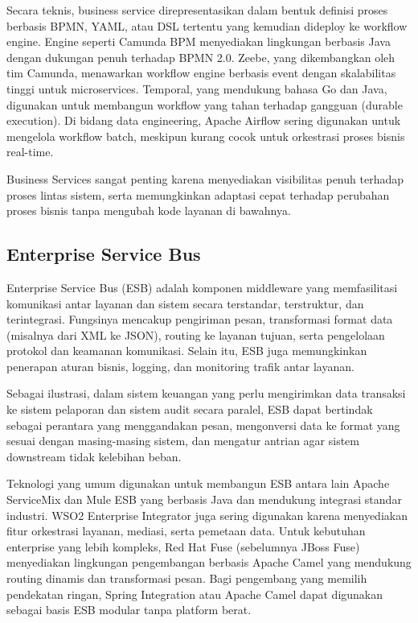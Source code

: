 Secara teknis, business service direpresentasikan dalam bentuk definisi proses berbasis BPMN, YAML, atau DSL tertentu yang kemudian dideploy ke workflow engine. Engine seperti Camunda BPM menyediakan lingkungan berbasis Java dengan dukungan penuh terhadap BPMN 2.0. Zeebe, yang dikembangkan oleh tim Camunda, menawarkan workflow engine berbasis event dengan skalabilitas tinggi untuk microservices. Temporal, yang mendukung bahasa Go dan Java, digunakan untuk membangun workflow yang tahan terhadap gangguan (durable execution). Di bidang data engineering, Apache Airflow sering digunakan untuk mengelola workflow batch, meskipun kurang cocok untuk orkestrasi proses bisnis real-time.

Business Services sangat penting karena menyediakan visibilitas penuh terhadap proses lintas sistem, serta memungkinkan adaptasi cepat terhadap perubahan proses bisnis tanpa mengubah kode layanan di bawahnya.

\subsection{Enterprise Service Bus}
Enterprise Service Bus (ESB) adalah komponen middleware yang memfasilitasi komunikasi antar layanan dan sistem secara terstandar, terstruktur, dan terintegrasi. Fungsinya mencakup pengiriman pesan, transformasi format data (misalnya dari XML ke JSON), routing ke layanan tujuan, serta pengelolaan protokol dan keamanan komunikasi. Selain itu, ESB juga memungkinkan penerapan aturan bisnis, logging, dan monitoring trafik antar layanan.

Sebagai ilustrasi, dalam sistem keuangan yang perlu mengirimkan data transaksi ke sistem pelaporan dan sistem audit secara paralel, ESB dapat bertindak sebagai perantara yang menggandakan pesan, mengonversi data ke format yang sesuai dengan masing-masing sistem, dan mengatur antrian agar sistem downstream tidak kelebihan beban.

Teknologi yang umum digunakan untuk membangun ESB antara lain Apache ServiceMix dan Mule ESB yang berbasis Java dan mendukung integrasi standar industri. WSO2 Enterprise Integrator juga sering digunakan karena menyediakan fitur orkestrasi layanan, mediasi, serta pemetaan data. Untuk kebutuhan enterprise yang lebih kompleks, Red Hat Fuse (sebelumnya JBoss Fuse) menyediakan lingkungan pengembangan berbasis Apache Camel yang mendukung routing dinamis dan transformasi pesan. Bagi pengembang yang memilih pendekatan ringan, Spring Integration atau Apache Camel dapat digunakan sebagai basis ESB modular tanpa platform berat.

